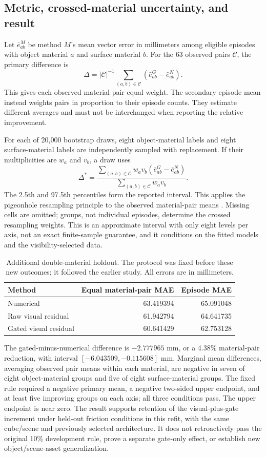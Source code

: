\subsection{Metric, crossed-material uncertainty, and result}
Let $\bar e^M_{ab}$ be method $M$'s mean vector error in millimeters among eligible episodes with object material $a$ and surface material $b$. For the 63 observed pairs $\mathcal C$, the primary difference is
\[
\Delta=|\mathcal C|^{-1}\sum_{(a,b)\in\mathcal C}
 (\bar e^{G}_{ab}-\bar e^{N}_{ab}).
\]
This gives each observed material pair equal weight. The secondary episode mean instead weights pairs in proportion to their episode counts. They estimate different averages and must not be interchanged when reporting the relative improvement.

For each of 20,000 bootstrap draws, eight object-material labels and eight surface-material labels are independently sampled with replacement. If their multiplicities are $w_a$ and $v_b$, a draw uses
\[
\Delta^*=\frac{\sum_{(a,b)\in\mathcal C}w_av_b
 (\bar e^{G}_{ab}-\bar e^{N}_{ab})}
 {\sum_{(a,b)\in\mathcal C}w_av_b}.
\]
The 2.5th and 97.5th percentiles form the reported interval. This applies the pigeonhole resampling principle to the observed material-pair means \cite{owen2007pigeonhole}. Missing cells are omitted; groups, not individual episodes, determine the crossed resampling weights. This is an approximate interval with only eight levels per axis, not an exact finite-sample guarantee, and it conditions on the fitted models and the visibility-selected data.

\begin{table}[htbp]\centering\small
\caption{Additional double-material holdout. The protocol was fixed before these new outcomes; it followed the earlier study. All errors are in millimeters.}
\begin{tabular}{lrr}\toprule Method & Equal material-pair MAE & Episode MAE\\\midrule
Numerical & 63.419394 & 65.091048\\
Raw visual residual & 61.942794 & 64.641735\\
Gated visual residual & 60.641429 & 62.753128\\\bottomrule
\end{tabular}\end{table}

The gated-minus-numerical difference is $-2.777965$ mm, or a 4.38\% material-pair reduction, with interval $[-6.043509,-0.115608]$ mm. Marginal mean differences, averaging observed pair means within each material, are negative in seven of eight object-material groups and five of eight surface-material groups. The fixed rule required a negative primary mean, a negative two-sided upper endpoint, and at least five improving groups on each axis; all three conditions pass. The upper endpoint is near zero. The result supports retention of the visual-plus-gate increment under held-out friction conditions in this refit, with the same cube/scene and previously selected architecture. It does not retroactively pass the original 10\% development rule, prove a separate gate-only effect, or establish new object/scene-asset generalization.

